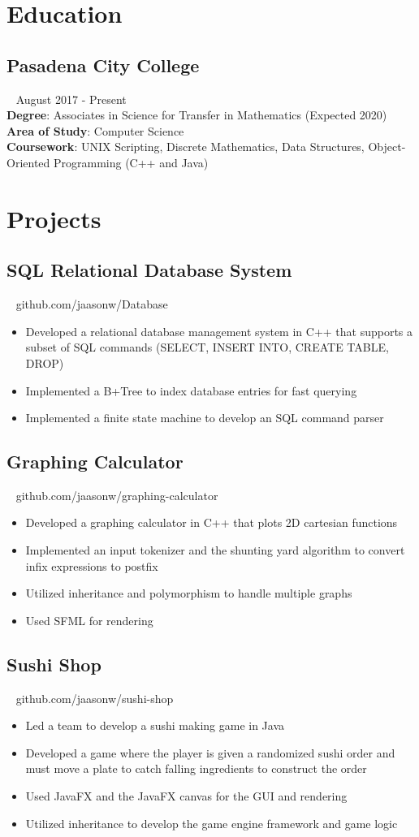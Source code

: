 \documentclass{article}
\newcommand{\resumesection}[3]{
    \subsection*{#1}
    \ 
    \footnotesize
    \textcolor{wordgrey}{#2}
    \normalsize
    \hfill
    \textcolor{wordgrey}{#3}
}
\begin{document}
\pagestyle{useheader}

\section*{Education}
\resumesection{Pasadena City College}{}{August 2017 - Present}\\
\textbf{Degree}: Associates in Science for Transfer in Mathematics (Expected 2020)\\
\textbf{Area of Study}: Computer Science\\
\textbf{Coursework}: UNIX Scripting, Discrete Mathematics, Data Structures, Object-Oriented Programming (C++ and Java)
\\
\section*{Projects}
\resumesection{SQL Relational Database System}{}{github.com/jaasonw/Database}
\begin{itemize}
    \item Developed a relational database management system in C++ that supports a subset of SQL commands (SELECT, INSERT INTO, CREATE TABLE, DROP) 
    \item Implemented a B+Tree to index database entries for fast querying
    \item Implemented a finite state machine to develop an SQL command parser
\end{itemize}

\resumesection{Graphing Calculator}{}{github.com/jaasonw/graphing-calculator}
\begin{itemize}
    \item Developed a graphing calculator in C++ that plots 2D cartesian functions
    \item Implemented an input tokenizer and the shunting yard algorithm to convert infix expressions to postfix
    \item Utilized inheritance and polymorphism to handle multiple graphs
    \item Used SFML for rendering
\end{itemize}

\resumesection{Sushi Shop}{}{github.com/jaasonw/sushi-shop}
\begin{itemize}
    \item Led a team to develop a sushi making game in Java
    \item Developed a game where the player is given a randomized sushi order and must move a plate to catch falling ingredients to construct the order
    \item Used JavaFX and the JavaFX canvas for the GUI and rendering
    \item Utilized inheritance to develop the game engine framework and game logic
\end{itemize}
\hfill
\end{document}
